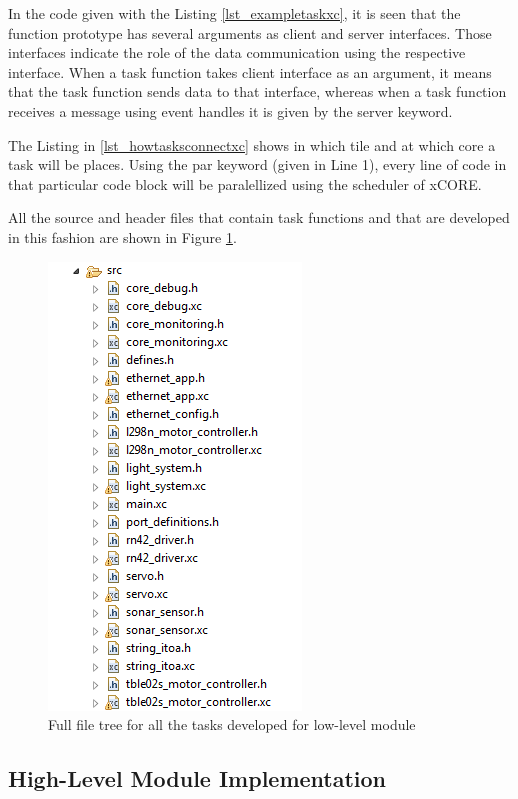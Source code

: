In the code given with the Listing \ref{lst_exampletaskxc}, it is seen that the function prototype has several arguments as client and server interfaces. Those interfaces indicate the role of the data communication using the respective interface. When a task function takes client interface as an argument, it means that the task function sends data to that interface, whereas when a task function receives a message using event handles it is given by the server keyword.
\newpage


The Listing in \ref{lst_howtasksconnectxc} shows in which tile and at which core a task will be places. Using the par keyword (given in Line 1), every line of code in that particular code block will be paralellized using the scheduler of xCORE. 

All the source and header files that contain task functions and that are developed in this fashion are shown in Figure \ref{fig:fullfiletree}.
\begin{figure}[!ht]
	\centering
	\includegraphics[scale=0.6]{content/images/fullfiletree.png}
	\caption{Full file tree for all the tasks developed for low-level module}
	\label{fig:fullfiletree}
\end{figure}

\subsection{High-Level Module Implementation}
